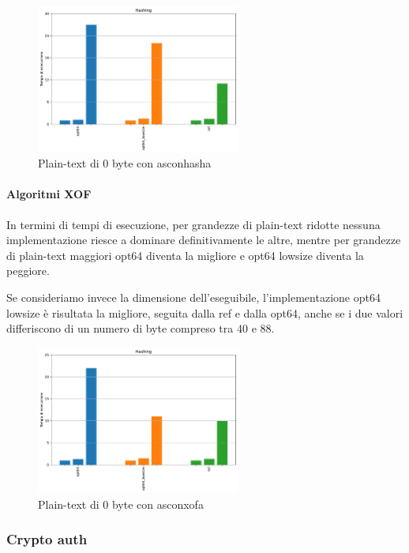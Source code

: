 \documentclass[12pt,a4paper,italian]{report}
\begin{document}
\begin{figure}[H]
    \centering
    \includegraphics[width=0.6\textwidth]{raspberry/asconhasha.pdf}
    \caption{Plain-text di 0 byte con asconhasha}
\end{figure}

\paragraph{Algoritmi XOF}

In termini di tempi di esecuzione, per grandezze di plain-text ridotte nessuna implementazione riesce a dominare definitivamente le altre, mentre per grandezze di plain-text maggiori opt64 diventa la migliore e opt64 lowsize diventa la peggiore.

\noindent Se consideriamo invece la dimensione dell'eseguibile, l'implementazione opt64 lowsize è risultata la migliore, seguita dalla ref e dalla opt64, anche se i due valori differiscono di un numero di byte compreso tra 40 e 88.

\begin{figure}[H]
    \centering
    \includegraphics[width=0.6\textwidth]{raspberry/asconxofa.pdf}
    \caption{Plain-text di 0 byte con asconxofa}
\end{figure}

\subsubsection{Crypto auth}
\end{document}
